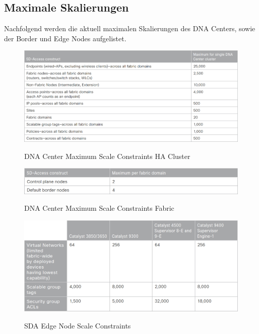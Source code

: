 \subsection{Maximale Skalierungen}
Nachfolgend werden die aktuell maximalen Skalierungen des DNA Centers, sowie der Border und Edge Nodes aufgelistet.
\begin{figure}[H]
	\centering
	\includegraphics[width=1\linewidth]{img/MaximumScale-HACluster.png}\\[1px]
	\caption{DNA Center Maximum Scale Constraints HA Cluster \cite{sda-designguide}}
	\label{fig:Maximum Scale HACluster}
\end{figure}

\begin{figure}[H]
	\centering
	\includegraphics[width=1\linewidth]{img/MaximumScale-Fabric.png}\\[1px]
	\caption{DNA Center Maximum Scale Constraints Fabric \cite{sda-designguide}}
	\label{fig:Maximum Scale Fabric}
\end{figure}

\begin{figure}[H]
	\centering
	\includegraphics[width=1\linewidth]{img/MaximumScale-EdgeNode.png}\\[1px]
	\caption{SDA Edge Node Scale Constraints \cite{sda-designguide}}
	\label{fig:SDA Edge Node Scale Constraints}
\end{figure}

